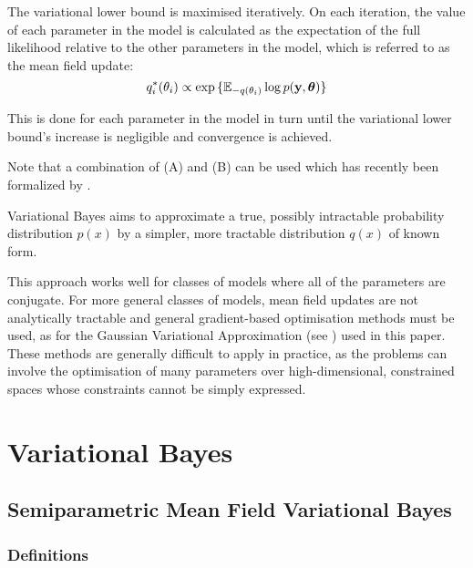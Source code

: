 \noindent The variational lower bound is maximised iteratively. On each iteration, the value of each parameter
in the model is calculated as the expectation of the full likelihood relative to the other parameters in the
model, which is referred to as the mean field update:
$$q_i^*(\theta_i) \propto \exp{\{ {\mathbb E}_{-q(\theta_i)} \log p({\bf y}, {\boldsymbol\theta}) \}}$$

\noindent This is done for each parameter in the model in turn until the variational lower bound's increase is
negligible and convergence is achieved.

Note that a combination of (A) and (B) can be used which has recently been formalized by \cite{Rohde2015}.

\noindent Variational Bayes aims to approximate a true, possibly intractable probability distribution $p(x)$
by a simpler, more tractable distribution $q(x)$ of known form.

This approach works well for classes of models where all of the parameters are conjugate. For more
general classes of models, mean field updates are not analytically tractable and general gradient-based
optimisation methods must be used, as for the Gaussian Variational Approximation (see \citep{Ormerod2012}) used
in this paper. These methods are generally difficult to apply in practice, as the problems can involve the
optimisation of many parameters over high-dimensional, constrained spaces whose constraints cannot be simply
expressed.

\section{Variational Bayes}
\label{sec:vb}



\subsection{Semiparametric Mean Field Variational Bayes}

\subsubsection{Definitions}


